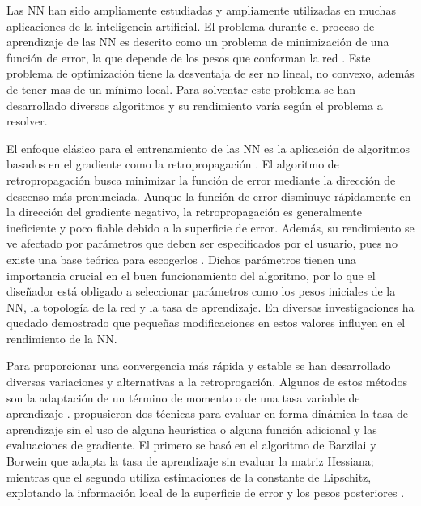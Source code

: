 Las NN han sido ampliamente estudiadas y ampliamente utilizadas en muchas aplicaciones de la inteligencia artificial. El problema durante el proceso de aprendizaje de las NN es descrito como un problema de minimización de una función de error, la que depende de los pesos que conforman la red \cite{Rumelhart1986}. Este problema de optimización tiene la desventaja de ser no lineal, no convexo, además de tener mas de un mínimo local. Para solventar este problema se han desarrollado diversos algoritmos \cite{Grippo1994,Jacobs1988,Plagianakos2002,Rumelhart1986b,Plagianakos1998}  y su rendimiento varía según el problema a resolver.

El enfoque clásico para el entrenamiento de las NN es la aplicación de algoritmos basados en el gradiente como la retropropagación \cite{Rumelhart1986b}. El algoritmo de retropropagación busca minimizar la función de error mediante la dirección de descenso más pronunciada. Aunque la función de error disminuye rápidamente en la dirección del gradiente negativo, la retropropagación es generalmente ineficiente y poco fiable \cite{Gori1992} debido a la superficie de error. Además, su rendimiento se ve afectado por parámetros que deben ser especificados por el usuario, pues no existe una base teórica para escogerlos \cite{Nguyen1990}. Dichos parámetros tienen una importancia crucial en el buen funcionamiento del algoritmo, por lo que el diseñador está obligado a seleccionar parámetros como los pesos iniciales de la NN, la topología de la red y la tasa de aprendizaje. En diversas investigaciones \cite{Cauchy1847, Grippo1994, Plagianakos1998, Plagianakos2002} ha quedado demostrado que pequeñas modificaciones en estos valores influyen en el rendimiento de la NN.

Para proporcionar una convergencia más rápida y estable se han desarrollado diversas variaciones y alternativas a la retroprogación. Algunos de estos métodos son la adaptación de un término de momento \cite{Jacobs1988, Rumelhart1986b} o de una tasa variable de aprendizaje \cite{Jacobs1988,Vogl1988}.  propusieron dos técnicas para evaluar en forma dinámica la tasa de aprendizaje sin el uso de alguna heurística o alguna función adicional y las evaluaciones de gradiente. El primero se basó en el algoritmo de Barzilai y Borwein \cite{Barzilai1988} que adapta la tasa de aprendizaje sin evaluar la matriz Hessiana; mientras que el segundo utiliza estimaciones de la constante de Lipschitz, explotando la información local de la superficie de error y los pesos posteriores \cite{Magoulas1997}.%

